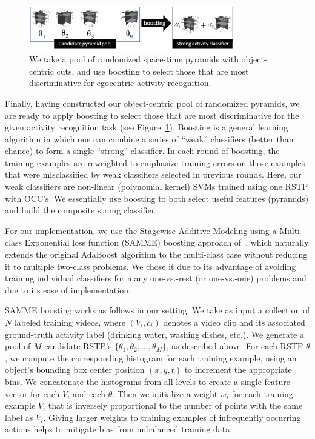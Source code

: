 \begin{figure}[t]
  \begin{center}
\includegraphics[width=9cm]{figures/concept-alg.png}
		   \caption{We take a pool of randomized space-time pyramids with object-centric cuts, and use boosting to select those that are most discriminative for egocentric activity recognition.}
\label{fig:concept-alg}
  \end{center}
\end{figure}


Finally, having constructed our object-centric pool of randomized pyramids, we are ready to apply boosting to select those that are most discriminative for the given activity recognition task (see Figure~\ref{fig:concept-alg}).  Boosting is a general learning algorithm in which one can combine a series of ``weak'' classifiers (better than chance) to form a single ``strong'' classifier.  In each round of boosting, the training examples are reweighted to emphasize training errors on those examples that were misclassified by weak classifiers selected in previous rounds. Here, our weak classifiers are non-linear (polynomial kernel) SVMs trained using one RSTP with OCC's.  We essentially use boosting to both select useful features (pyramids) and build the composite strong classifier.

For our implementation, we use the Stagewise Additive Modeling using a Multi-class Exponential loss function (SAMME) boosting approach of~\cite{Zhu06}, which naturally extends the original AdaBoost algorithm to the multi-class case without reducing it to multiple two-class problems.  We chose it due to its advantage of avoiding training individual classifiers for many one-vs.-rest (or one-vs.-one) problems and due to its ease of implementation.

SAMME boosting works as follows in our setting.  We take as input a collection of $N$ labeled training videos, where $(V_i, c_i)$ denotes a video clip and its associated ground-truth  activity label (drinking water, washing dishes, etc.).  We generate a pool of $M$ candidate RSTP's  $\{\theta_1, \theta_2, ..., \theta_M\}$, as described above.  For each RSTP $\theta$, we compute the corresponding histogram for each training example, using an object's bounding box center position $(x,y,t)$ to increment the appropriate bins.  We concatenate the histograms from all levels to create a single feature vector for each $V_i$ and each $\theta$.  Then we initialize a weight $w_i$ for each training example $V_i$ that is inversely proportional to the number of points with the same label as $V_i$. Giving larger weights to training examples of infrequently occurring actions helps to mitigate bias from imbalanced training data.


